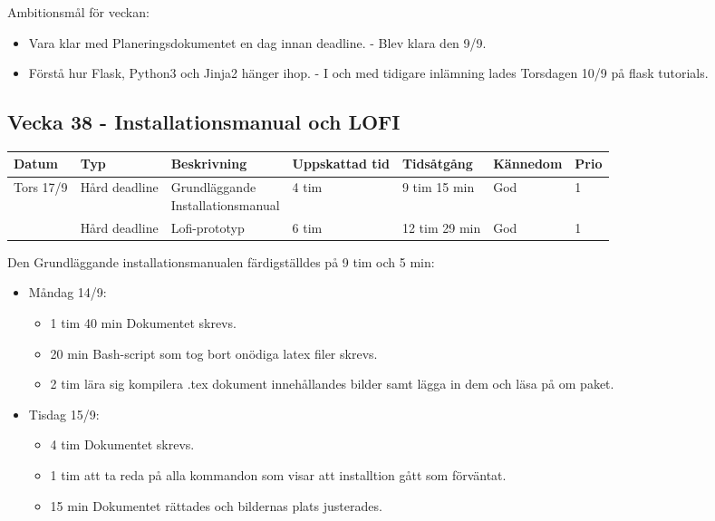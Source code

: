 \documentclass{TDP003mall}
\begin{document}
      Ambitionsmål för veckan:
      \begin{itemize}
      \item Vara klar med Planeringsdokumentet en dag innan deadline. - Blev klara den 9/9.
      \item Förstå hur Flask, Python3 och Jinja2 hänger ihop. - I och med tidigare inlämning lades Torsdagen 10/9 på flask tutorials.
      \end{itemize}
      

\newpage


\subsection*{Vecka 38 - Installationsmanual och LOFI}
\begin{tabularx}{\linewidth}{|l|l|l|l|l|l|l|}
	\hline
	Datum & Typ           & Beskrivning                       & Uppskattad tid & Tidsåtgång    & Kännedom & Prio\\
	\hline                                                    
	Tors 17/9  & Hård deadline &\makecell[tl]{Grundläggande \\Installationsmanual} & 4 tim             & 9 tim 15 min  & God      & 1\\
	\hline                                                    
          & Hård deadline & Lofi-prototyp                     & 6 tim             & 12 tim 29 min & God      & 1\\
	\hline
\end{tabularx}

Den Grundläggande installationsmanualen färdigställdes på 9 tim och 5 min:
\begin{itemize}
	\item Måndag 14/9:
	\begin{itemize}
		\item 1 tim 40 min Dokumentet skrevs.
		\item 20 min Bash-script som tog bort onödiga latex filer skrevs.
		\item 2 tim lära sig kompilera .tex dokument innehållandes bilder samt lägga in dem och läsa på om paket.
	\end{itemize}
	\item Tisdag 15/9:
	\begin{itemize}
		\item 4 tim Dokumentet skrevs.
		\item 1 tim att ta reda på alla kommandon som visar att installtion gått som förväntat.
		\item 15 min Dokumentet rättades och bildernas plats justerades.
	\end{itemize}
\end{itemize}
\end{document}
